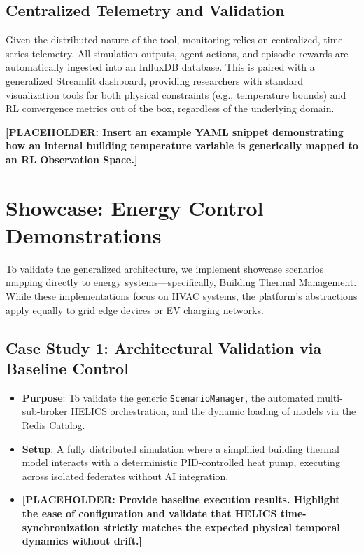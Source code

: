 \subsection{Centralized Telemetry and Validation}
Given the distributed nature of the tool, monitoring relies on centralized, time-series telemetry. All simulation outputs, agent actions, and episodic rewards are automatically ingested into an InfluxDB database. This is paired with a generalized Streamlit dashboard, providing researchers with standard visualization tools for both physical constraints (e.g., temperature bounds) and RL convergence metrics out of the box, regardless of the underlying domain.

\textbf{[PLACEHOLDER: Insert an example YAML snippet demonstrating how an internal building temperature variable is generically mapped to an RL Observation Space.]}

\section{Showcase: Energy Control Demonstrations}
To validate the generalized architecture, we implement showcase scenarios mapping directly to energy systems—specifically, Building Thermal Management. While these implementations focus on HVAC systems, the platform's abstractions apply equally to grid edge devices or EV charging networks.

\subsection{Case Study 1: Architectural Validation via Baseline Control}
\begin{itemize}
    \item \textbf{Purpose}: To validate the generic \texttt{ScenarioManager}, the automated multi-sub-broker HELICS orchestration, and the dynamic loading of models via the Redis Catalog.
    \item \textbf{Setup}: A fully distributed simulation where a simplified building thermal model interacts with a deterministic PID-controlled heat pump, executing across isolated federates without AI integration.
    \item \textbf{[PLACEHOLDER: Provide baseline execution results. Highlight the ease of configuration and validate that HELICS time-synchronization strictly matches the expected physical temporal dynamics without drift.]}
\end{itemize}

